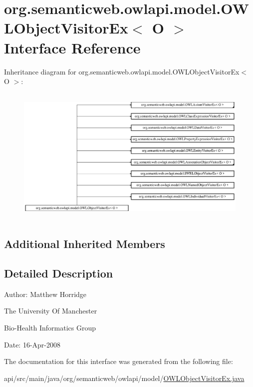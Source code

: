 \hypertarget{interfaceorg_1_1semanticweb_1_1owlapi_1_1model_1_1_o_w_l_object_visitor_ex_3_01_o_01_4}{\section{org.\-semanticweb.\-owlapi.\-model.\-O\-W\-L\-Object\-Visitor\-Ex$<$ O $>$ Interface Reference}
\label{interfaceorg_1_1semanticweb_1_1owlapi_1_1model_1_1_o_w_l_object_visitor_ex_3_01_o_01_4}
}
Inheritance diagram for org.\-semanticweb.\-owlapi.\-model.\-O\-W\-L\-Object\-Visitor\-Ex$<$ O $>$\-:\begin{figure}[H]
\begin{center}
\leavevmode
\includegraphics[height=6.682577cm]{interfaceorg_1_1semanticweb_1_1owlapi_1_1model_1_1_o_w_l_object_visitor_ex_3_01_o_01_4}
\end{center}
\end{figure}
\subsection*{Additional Inherited Members}


\subsection{Detailed Description}
Author\-: Matthew Horridge\par
 The University Of Manchester\par
 Bio-\/\-Health Informatics Group\par
 Date\-: 16-\/\-Apr-\/2008\par
\par
 

The documentation for this interface was generated from the following file\-:\begin{DoxyCompactItemize}
\item 
api/src/main/java/org/semanticweb/owlapi/model/\hyperlink{_o_w_l_object_visitor_ex_8java}{O\-W\-L\-Object\-Visitor\-Ex.\-java}\end{DoxyCompactItemize}
